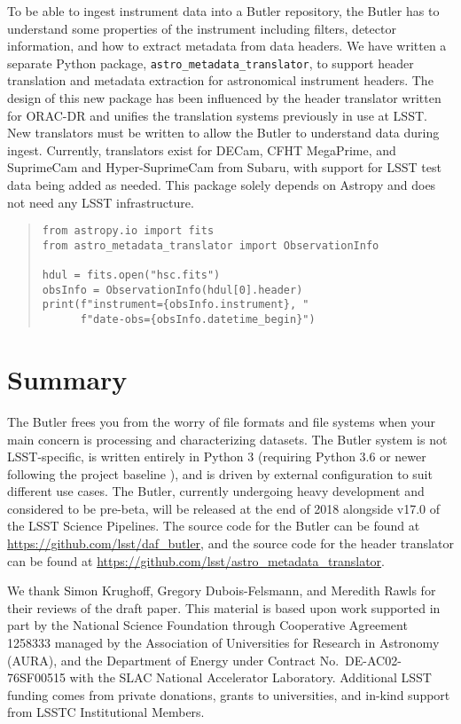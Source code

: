 \documentclass[11pt,twoside]{article}
\begin{document}
To be able to ingest instrument data into a Butler repository, the Butler has to understand some properties of the instrument including filters, detector information, and how to extract metadata from data headers.
We have written a separate Python package, \texttt{astro\_metadata\_translator}, to support header translation and metadata extraction for astronomical instrument headers.
The design of this new package has been influenced by the header translator written for ORAC-DR \citep{2015A&C.....9...40J} and unifies the translation systems previously in use at LSST.
New translators must be written to allow the Butler to understand data during ingest.
Currently, translators exist for DECam, CFHT MegaPrime, and SuprimeCam and Hyper-SuprimeCam from Subaru, with support for LSST test data being added as needed.
This package solely depends on Astropy \citep{2018AJ....156..123A} and does not need any LSST infrastructure.

\begin{quote}
\begin{small}
\begin{verbatim}
from astropy.io import fits
from astro_metadata_translator import ObservationInfo

hdul = fits.open("hsc.fits")
obsInfo = ObservationInfo(hdul[0].header)
print(f"instrument={obsInfo.instrument}, "
      f"date-obs={obsInfo.datetime_begin}")
\end{verbatim}
\end{small}
\end{quote}

\section{Summary}

The Butler frees you from the worry of file formats and file systems when your main concern is processing and characterizing datasets.
The Butler system is not LSST-specific, is written entirely in Python 3 (requiring Python 3.6 or newer following the project baseline \citep{P9-123_adassxxvii}), and is driven by external configuration to suit different use cases.
The Butler, currently undergoing heavy development and considered to be pre-beta, will be released at the end of 2018 alongside v17.0 of the LSST Science Pipelines.
The source code for the Butler can be found at \url{https://github.com/lsst/daf_butler}, and the source code for the header translator can be found at \url{https://github.com/lsst/astro_metadata_translator}.


\acknowledgements We thank Simon Krughoff, Gregory Dubois-Felsmann, and Meredith Rawls for their reviews of the draft paper.
This material is based upon work supported in part by the National Science Foundation through Cooperative Agreement 1258333 managed by the Association of Universities for Research in Astronomy (AURA), and the Department of Energy under Contract No.\ DE-AC02-76SF00515 with the SLAC National Accelerator Laboratory.
Additional LSST funding comes from private donations, grants to universities, and in-kind support from LSSTC Institutional Members.

\end{document}
